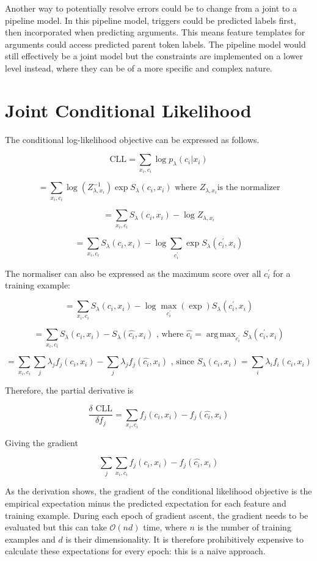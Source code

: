 \documentclass{article} %
\DeclareMathOperator*{\argmax}{arg\,max}
\begin{document}
Another way to potentially resolve errors could be to change from a joint to a pipeline model. In this pipeline model, triggers could be predicted labels first, then incorporated when predicting arguments. This means feature templates for arguments could access predicted parent token labels. The pipeline model would still effectively be a joint model but the constraints are implemented on a lower level instead, where they can be of a more specific and complex nature.

\section{Joint Conditional Likelihood}

The conditional log-likelihood objective can be expressed as follows.


\[\text{CLL}=\sum_{x_i, c_i} \log p_{\lambda}(c_i | x_i)\]

\[=\sum_{x_i, c_i} \log (Z^{-1}_{\lambda, x_i}) \exp S_{\lambda} (c_i, x_i) \text{ where } Z_{\lambda, x_i} \text{is the normalizer}\]

\[=\sum_{x_i, c_i} S_{\lambda} (c_i, x_i) - \log Z_{\lambda, x_i}\]

\[=\sum_{x_i, c_i} S_{\lambda} (c_i, x_i) - \log \sum_{c^{'}_i} \exp S_{\lambda} (c^{'}_i, x_i)    \]

The normaliser can also be expressed as the maximum score over all $c^{'}_i$ for a training example:

\[=\sum_{x_i, c_i} S_{\lambda} (c_i, x_i) - \log \max_{c^{'}_i} (\exp ) S_{\lambda} (c^{'}_i, x_i)   \]

\[=\sum_{x_i, c_i} S_{\lambda} (c_i, x_i) - S_{\lambda} (\hat{c_i}, x_i) \text{ , where }   \hat{c_i} = \argmax_{c^{'}_i}  S_{\lambda} (c^{'}_i, x_i)   \]

\[=\sum_{x_i, c_i} \sum_j \lambda_j f_j (c_i, x_i) - \sum_j \lambda_j f_j (\hat{c_i}, x_i)  \text{ , since } S_{\lambda} (c_i, x_i) = \sum_i \lambda_i f_i (c_i, x_i)  \]

Therefore, the partial derivative is

\[ \frac{\delta \text{ CLL}}{\delta f_j} = \sum_{x_i, c_i} f_j (c_i, x_i) - f_j (\hat{c_i}, x_i)        \]

Giving the gradient

\[ \sum_j \sum_{x_i, c_i} f_j (c_i, x_i) - f_j (\hat{c_i}, x_i)        \]

As the derivation shows, the gradient of the conditional likelihood objective is the empirical expectation minus the predicted expectation for each feature and training example. During each epoch of gradient ascent, the gradient needs to be evaluated but this can take $\mathcal{O}(nd)$ time, where $n$ is the number of training examples and $d$ is their dimensionality. It is therefore prohibitively expensive to calculate these expectations for every epoch: this is a naive approach.
\end{document}
